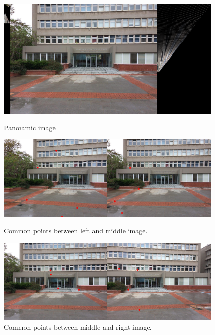 \documentclass[letterpaper,12pt]{article}
\begin{document}
\begin{figure}[!htb]
        \centering\includegraphics[width=1\columnwidth]{experiments/5points/final3wrong.jpg}
          \caption{
                \label{} Panoramic image
        }
        \centering\includegraphics[width=1\columnwidth]{experiments/5points/left-1_middle3wrong.jpg}
          \caption{
                \label{} Common points between left and middle image.
        }
        \centering\includegraphics[width=1\columnwidth]{experiments/5points/middle_left-13wrong.jpg}
        \caption{
                \label{} Common points between middle and right image.
        }
\end{figure}
\FloatBarrier
\newpage
\end{document}
